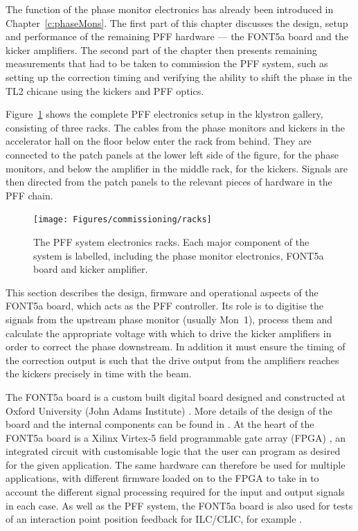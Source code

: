 
The function of the phase monitor electronics has already been introduced in Chapter~\ref{c:phaseMons}. The first part of this chapter discusses the design, setup and performance of the remaining PFF hardware --- the FONT5a board and the kicker amplifiers. The second part of the chapter then presents remaining measurements that had to be taken to commission the PFF system, such as setting up the correction timing and verifying the ability to shift the phase in the TL2 chicane using the kickers and PFF optics.

Figure~\ref{f:racks} shows the complete PFF electronics setup in the klystron gallery, consisting of three racks. The cables from the phase monitors and kickers in the accelerator hall on the floor below enter the rack from behind. They are connected to the patch panels at the lower left side of the figure, for the phase monitors, and below the amplifier in the middle rack, for the kickers. Signals are then directed from the patch panels to the relevant pieces of hardware in the PFF chain. 

\begin{figure}
  \centering
  \texttt{[image: Figures/commissioning/racks]}
  \caption{The PFF system electronics racks. Each major component of the system is labelled, including the phase monitor electronics, FONT5a board and kicker amplifier.}
  \label{f:racks}
\end{figure}


This section describes the design, firmware and operational aspects of the FONT5a board, which acts as the PFF controller. Its role is to digitise the signals from the upstream phase monitor (usually Mon~1), process them and calculate the appropriate voltage with which to drive the kicker amplifiers in order to correct the phase downstream. In addition it must ensure the timing of the correction output is such that the drive output from the amplifiers reaches the kickers precisely in time with the beam.

The FONT5a board is a custom built digital board designed and constructed at Oxford University (John Adams Institute) \cite{fontGroup}. More details of the design of the board and the internal components can be found in \cite{dougThesis}. 
At the heart of the FONT5a board is a Xilinx Virtex-5 field programmable gate array (FPGA) \cite{xilinx}, an integrated circuit with customisable logic that the user can program as desired for the given application. The same hardware can therefore be used for multiple applications, with different firmware loaded on to the FPGA to take in to account the different signal processing required for the input and output signals in each case. As well as the PFF system, the FONT5a board is also used for tests of an interaction point position feedback for ILC/CLIC, for example \cite{ipfbIPAC16}. 

